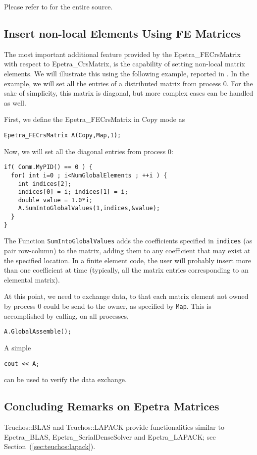 \smallskip

Please refer to  for the entire source.


\subsection{Insert non-local Elements Using FE Matrices}
\label{sec:fematrix}

The most important additional feature provided by the
Epetra\_FECrsMatrix with respect to Epetra\_CrsMatrix, is the capability
of setting non-local matrix elements. We will illustrate this using the
following example, reported in . In the example,
we will set all the entries of a distributed matrix from process 0. For
the sake of simplicity, this matrix is diagonal, but more complex cases
can be handled as well.

First, we define the Epetra\_FECrsMatrix in Copy mode as
\begin{verbatim}
Epetra_FECrsMatrix A(Copy,Map,1);
\end{verbatim}
Now, we will set all the diagonal entries from process 0:
\begin{verbatim}
if( Comm.MyPID() == 0 ) {
  for( int i=0 ; i<NumGlobalElements ; ++i ) {
    int indices[2];
    indices[0] = i; indices[1] = i;
    double value = 1.0*i;
    A.SumIntoGlobalValues(1,indices,&value);
  }
}
\end{verbatim}
The Function \verb!SumIntoGlobalValues! adds the coefficients specified
in \verb!indices! (as pair row-column) to the matrix, adding them to any
coefficient that may exist at the specified location. In a finite
element code, the user will probably insert more than one coefficient
at time (typically, all the matrix entries corresponding to an elemental
matrix).

At this point, we need to exchange data, to that each matrix element not
owned by process 0 could be send to the owner, as specified by
\verb!Map!. This is accomplished by calling, on all processes,
\begin{verbatim}
A.GlobalAssemble();
\end{verbatim}
A simple 
\begin{verbatim}
cout << A;
\end{verbatim}
can be used to verify the data exchange.


\subsection{Concluding Remarks on Epetra Matrices}
\label{sec:epetra_mat_conclusions}

Teuchos::BLAS and Teuchos::LAPACK provide functionalities similar to
Epetra\_BLAS, Epetra\_SerialDenseSolver and Epetra\_LAPACK; see
Section~(\ref{sec:teuchos:lapack}).



